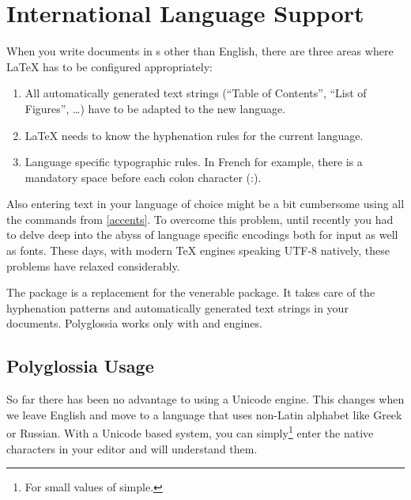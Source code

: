 \section{International Language Support}\label{sec:polyglossia}
%
 When you write documents in s
other than English, there are three areas where \LaTeX{} has to be
configured appropriately:

\begin{enumerate}
  \item All automatically generated text strings (\enquote{Table of Contents},
        \enquote{List of Figures}, \ldots) have to be adapted to the new language.
  \item \LaTeX{} needs to know the hyphenation rules for the current language.
  \item Language specific typographic rules. In French for example, there is a
        mandatory space before each colon character (:).
\end{enumerate}

Also entering text in your language of choice might be a bit cumbersome using
all the commands from \autoref{accents}. To overcome this problem, until
recently you had to delve deep into the abyss of language specific encodings
both for input as well as fonts. These days, with modern \TeX{} engines
speaking UTF-8 natively, these problems have relaxed considerably.

The package  is a replacement for the venerable 
package. It takes care of the hyphenation patterns and automatically generated
text strings in your documents. Polyglossia works only with 
and  engines.

\subsection{Polyglossia Usage}

So far there has been no advantage to using a Unicode  engine. This
changes when we leave English and move to a language that uses non-Latin
alphabet like Greek or Russian. With a Unicode based system, you can
simply\footnote{For small values of simple.} enter the native characters in
your editor and  will understand them.

